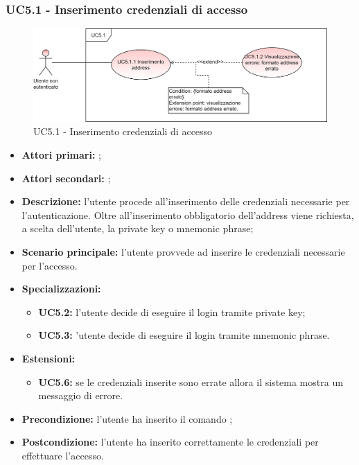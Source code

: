 \subsubsection{UC5.1 - Inserimento credenziali di accesso }
\begin{figure}[h]
	\centering
	\includegraphics[scale=\ucs]{./res/img/UC5.1.png}
	\caption {UC5.1 - Inserimento credenziali di accesso }
\end{figure}
\begin{itemize}
	\item \textbf{Attori primari:} \una{};
	\item \textbf{Attori secondari:} \re{};
	\item \textbf{Descrizione:} l’utente procede all’inserimento delle credenziali necessarie per l'autenticazione. Oltre all’inserimento obbligatorio dell’address viene richiesta, a scelta dell’utente, la private key o mnemonic phrase; 
	\item \textbf{Scenario principale:} l'utente provvede ad inserire le credenziali necessarie per l’accesso.  
	\item \textbf{Specializzazioni:} 
	\begin{itemize}
		\item \textbf{UC5.2:} l’utente decide di eseguire il login tramite private key;
		\item \textbf{UC5.3:} ’utente decide di eseguire il login tramite mnemonic phrase.
	\end{itemize}
	\item \textbf{Estensioni:} 
	\begin{itemize}
		\item \textbf{UC5.6:} se le credenziali inserite sono errate allora il sistema mostra un messaggio di errore.  
	\end{itemize}
	\item \textbf{Precondizione:}  l’utente ha inserito il comando \login{};   
	\item \textbf{Postcondizione:} l'utente ha inserito correttamente le credenziali per effettuare l’accesso. 
\end{itemize}